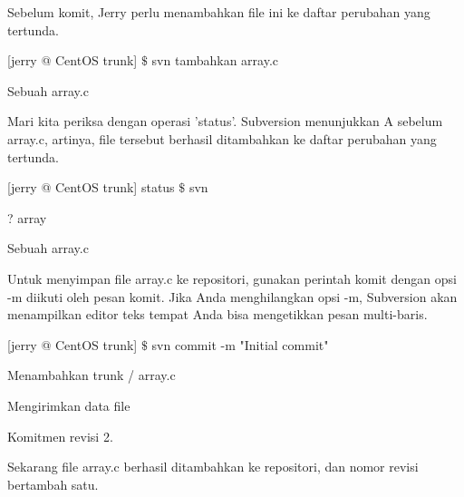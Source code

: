 \noindent 
Sebelum komit, Jerry perlu menambahkan file ini ke daftar perubahan yang tertunda. \par
\vspace{\baselineskip}
\vspace{\baselineskip}
\noindent 
 \hspace*{0.5in} [jerry @ CentOS trunk]  $  \$  $ svn tambahkan array.c \par
 \vspace{\baselineskip}
\noindent 
 \hspace*{0.5in} Sebuah array.c \par
 \vspace{\baselineskip}
\noindent 
Mari kita periksa dengan operasi 'status'. Subversion menunjukkan A sebelum array.c, artinya, file tersebut berhasil ditambahkan ke daftar perubahan yang tertunda. \par
\vspace{\baselineskip}
\noindent 
 \hspace*{0.5in} [jerry @ CentOS trunk] status  $  \$  $ svn \par
\noindent 
 \hspace*{0.5in} ? array \par
 \vspace{\baselineskip}
\noindent 
Sebuah array.c \par
\vspace{\baselineskip}
\noindent 
Untuk menyimpan file array.c ke repositori, gunakan perintah komit dengan opsi -m diikuti oleh pesan komit. Jika Anda menghilangkan opsi -m, Subversion akan menampilkan editor teks tempat Anda bisa mengetikkan pesan multi-baris. \par
\vspace{\baselineskip}
\noindent 
 \hspace*{0.5in} \vspace{12pt}
\noindent 
 \hspace*{0.5in} [jerry @ CentOS trunk]  $  \$  $ svn commit -m "Initial commit" \par
\noindent 
 \hspace*{0.5in} Menambahkan trunk / array.c \par
\noindent 
 \hspace*{0.5in} Mengirimkan data file \par
\noindent 
 \hspace*{0.5in} Komitmen revisi 2. \par
\noindent 
 \hspace*{0.5in} Sekarang file array.c berhasil ditambahkan ke repositori, dan nomor revisi bertambah satu. \par

